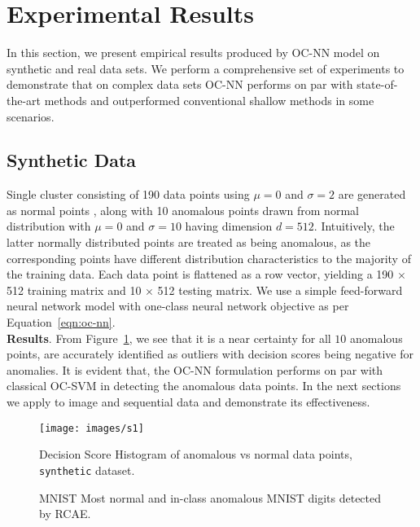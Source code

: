 \section{Experimental Results}
\label{sec:ocnnexperiment-results}

In this section, we present empirical results produced by OC-NN model on synthetic and real data sets. We perform a comprehensive set of experiments to demonstrate that on complex data sets OC-NN performs on par with state-of-the-art methods and outperformed conventional shallow methods in some scenarios.
\subsection{ Synthetic Data}
Single cluster consisting of 190 data points using $\mu=0$ and $\sigma = 2$ are generated as normal points , along with 10 anomalous points drawn from normal distribution with $\mu=0$ and $\sigma = 10$ having  dimension $d=512$. Intuitively, the latter normally distributed points are treated as being anomalous, as the corresponding points have different distribution characteristics to the majority of the training data. Each data point is flattened as a row vector, yielding a 190 $\times$ 512 training matrix and 10 $\times$ 512 testing matrix. We use a simple feed-forward neural network model with one-class neural network  objective as per Equation~\ref{eqn:oc-nn}.\\
\textbf{Results}.
From Figure~\ref{fig:synthetic-histogram}, we see that it is a near certainty for all $10$ anomalous points, are accurately identified as outliers with decision scores being negative for anomalies. It is evident that, the OC-NN formulation performs on par with classical OC-SVM in detecting the anomalous data points. In the next sections we apply to image and sequential data and demonstrate its effectiveness.


\begin{figure}
    \centering
    \texttt{[image: images/s1]}
    \caption{Decision Score Histogram of anomalous vs normal data points, {\tt synthetic} dataset.}
    \label{fig:synthetic-histogram}
\end{figure}

  \begin{figure}[htp]
    \centering
    \hspace{1em}%
    \caption{MNIST Most normal and in-class anomalous MNIST digits detected by RCAE.}
    \label{fig:mnistRCAEresults}
  \end{figure}



